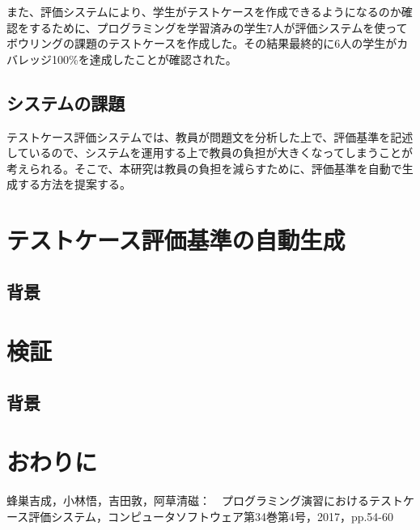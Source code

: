 \documentclass{tpu-sotu}
\begin{document}
また、評価システムにより、学生がテストケースを作成できるようになるのか確認をするために、プログラミングを学習済みの学生7人が評価システムを使ってボウリングの課題のテストケースを作成した。その結果最終的に6人の学生がカバレッジ100\%を達成したことが確認された。
\section{システムの課題}
テストケース評価システムでは、教員が問題文を分析した上で、評価基準を記述しているので、システムを運用する上で教員の負担が大きくなってしまうことが考えられる。そこで、本研究は教員の負担を減らすために、評価基準を自動で生成する方法を提案する。
\chapter{テストケース評価基準の自動生成}
\section{背景}
\chapter{検証}
\section{背景}
\chapter{おわりに}
\acknowledgements
\begin{thebibliography}{1}
    蜂巣吉成，小林悟，吉田敦，阿草清磁：　プログラミング演習におけるテストケース評価システム，コンピュータソフトウェア第34巻第4号，2017，pp.54-60
\end{thebibliography}
\end{document}
